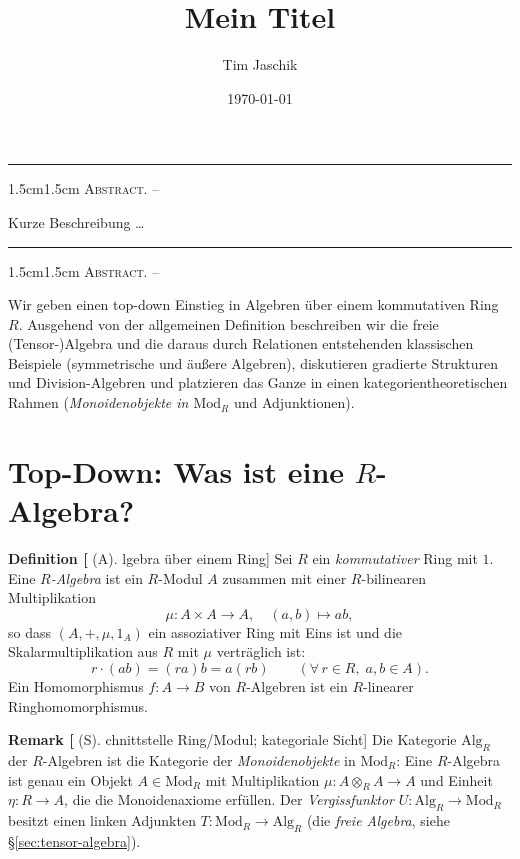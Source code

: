 \documentclass[10pt, letterpaper]{article}
\title{Mein Titel}
\author{Tim Jaschik}
\date{\today}
\newcommand{\Mod}{\mathrm{Mod}}
\newcommand{\Alg}{\mathrm{Alg}}
\renewenvironment{abstract}
  {
    \begin{adjustwidth}{1.5cm}{1.5cm}
    \small
    \textsc{Abstract. –}%
  }
  {
    \end{adjustwidth}
  }
\newcommand{\CustomHeading}[3]{%
  \par\medskip\noindent%
  \textbf{#1 #2} \textnormal{(#3)}.\enskip%
}
\newenvironment{DEF}[2]{\begin{unitbox}\CustomHeading{Definition}{#1}{#2}}{\end{unitbox}}
\newenvironment{REM}[2]{\begin{unitbox}\CustomHeading{Remark}{#1}{#2}}{\end{unitbox}}
\begin{document}
\maketitle
\rule{\textwidth}{0.5pt}
\begin{abstract}
Kurze Beschreibung …
\end{abstract}
\rule{\textwidth}{0.5pt}
\vspace{0.5cm}

\tableofcontents

\pagebreak



\begin{abstract}
Wir geben einen top-down Einstieg in Algebren über einem kommutativen Ring \(R\).
Ausgehend von der allgemeinen Definition beschreiben wir die freie (Tensor-)Algebra und die daraus
durch Relationen entstehenden klassischen Beispiele (symmetrische und äußere Algebren),
diskutieren gradierte Strukturen und Division-Algebren und platzieren das Ganze in einen
kategorientheoretischen Rahmen (\emph{Monoidenobjekte in \(\Mod_R\)} und Adjunktionen).
\end{abstract}

\section{Top-Down: Was ist eine \(R\)-Algebra?}

\begin{DEF}[Algebra über einem Ring]
Sei \(R\) ein \emph{kommutativer} Ring mit \(1\).
Eine \emph{\(R\)-Algebra} ist ein \(R\)-Modul \(A\) zusammen mit einer \(R\)-bilinearen Multiplikation
\[
\mu:A\times A\to A,\quad (a,b)\mapsto ab,
\]
so dass \((A,+,\mu,1_A)\) ein assoziativer Ring mit Eins ist und die Skalarmultiplikation aus \(R\) mit \(\mu\) verträglich ist:
\[
r\cdot(ab)=(ra)b=a(rb)\qquad(\forall\,r\in R,\;a,b\in A).
\]
Ein Homomorphismus \(f:A\to B\) von \(R\)-Algebren ist ein \(R\)-linearer Ringhomomorphismus.
\end{DEF}

\begin{REM}[Schnittstelle Ring/Modul; kategoriale Sicht]
Die Kategorie \(\Alg_R\) der \(R\)-Algebren ist die Kategorie der \emph{Monoidenobjekte} in \(\Mod_R\):
Eine \(R\)-Algebra ist genau ein Objekt \(A\in\Mod_R\) mit Multiplikation \(\mu:A\otimes_R A\to A\) und Einheit \(\eta:R\to A\),
die die Monoidenaxiome erfüllen.
Der \emph{Vergissfunktor} \(U:\Alg_R\to\Mod_R\) besitzt einen linken Adjunkten \(T:\Mod_R\to\Alg_R\)
(die \emph{freie Algebra}, siehe §\ref{sec:tensor-algebra}).
\end{REM}
\end{document}
